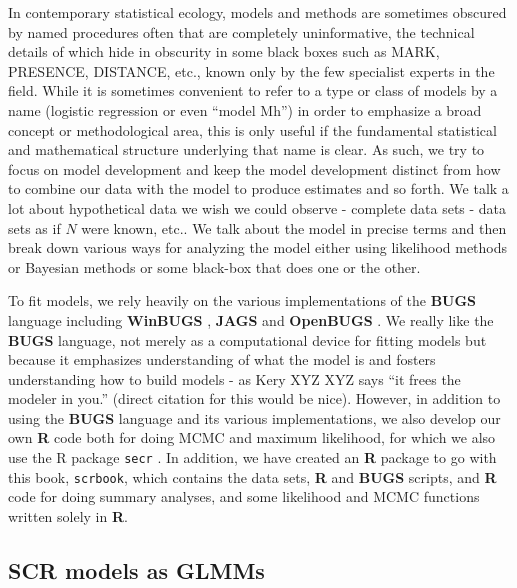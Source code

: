 In contemporary statistical ecology, models and methods are sometimes
obscured by named procedures often that are completely uninformative,
the technical details of which hide in obscurity in some black boxes
such as MARK, PRESENCE, DISTANCE, etc., known only by the few
specialist experts in the field. While it is sometimes convenient to
refer to a type or class of models by a name (logistic regression or
even ``model Mh'') in order to emphasize a broad concept or
methodological area, this is only useful if the fundamental
statistical and mathematical structure underlying that name is
clear. As such, we try to focus on model development and keep the
model development distinct from how to combine our data with the model
to produce estimates and so forth. We talk a lot about hypothetical
data we wish we could observe - complete data sets - data sets as if
$N$ were known, etc.. We talk about the model in precise terms and
then break down various ways for analyzing the model either using
likelihood methods or Bayesian methods or some black-box that does one
or the other.

To fit models, we rely heavily on the various implementations of the
{\bf BUGS} language including {\bf WinBUGS} \citep{lunn_etal:2000},
{\bf JAGS} \citep{plummer:2003}
 and {\bf OpenBUGS} \citep{thomas_etal:2006}. We really like
the {\bf BUGS} language, not merely  as a computational device for
fitting models but because it emphasizes
understanding of what the model is and fosters understanding how to
build models - as Kery XYZ XYZ says ``it frees the modeler in you.''  (direct
citation for this would be nice).  However, in addition to using the
{\bf BUGS} language and its various implementations, we also develop our own
{\bf R} code both for doing MCMC
and maximum likelihood, for which we also use the R
package \mbox{\tt secr} \citep{efford:2011}. In addition, we have
created an {\bf R} package to go with this book, \mbox{\tt scrbook},
which contains the data sets, {\bf R} and {\bf BUGS} scripts, and {\bf
  R} code for doing summary analyses, and some likelihood and MCMC
functions written solely in {\bf R}.


\subsection{SCR models as GLMMs}

